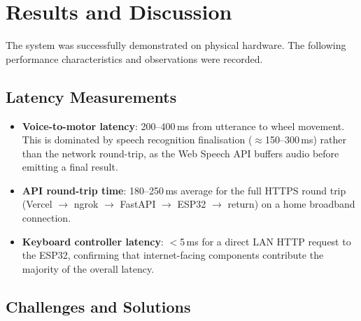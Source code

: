 \documentclass[12pt]{report}
\begin{document}
\chapter{Results and Discussion}

The system was successfully demonstrated on physical hardware. The following
performance characteristics and observations were recorded.

\section{Latency Measurements}

\begin{itemize}
    \item \textbf{Voice-to-motor latency}: 200--400\,ms from utterance to wheel
          movement. This is dominated by speech recognition finalisation
          ($\approx$150--300\,ms) rather than the network round-trip, as the
          Web Speech API buffers audio before emitting a final result.

    \item \textbf{API round-trip time}: 180--250\,ms average for the full HTTPS
          round trip (Vercel $\to$ ngrok $\to$ FastAPI $\to$ ESP32 $\to$ return)
          on a home broadband connection.

    \item \textbf{Keyboard controller latency}: $<$5\,ms for a direct LAN HTTP
          request to the ESP32, confirming that internet-facing components
          contribute the majority of the overall latency.
\end{itemize}

\section{Challenges and Solutions}
\end{document}
